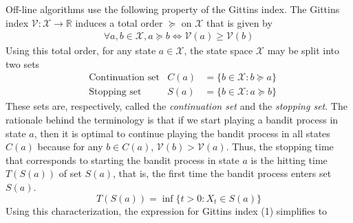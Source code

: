 \documentclass[11pt]{elegantbook}
\begin{document}
Off-line algorithms use the following property of the Gittins index. The Gittins
index $\mathcal{V}: \mathcal{X} \rightarrow \mathbb{R}$ induces a total order $\succeq$ on $\mathcal{X}$ that is given by
\begin{equation}
    \begin{aligned}
        \forall a,b\in \mathcal{X}, a\succeq b \Leftrightarrow \mathcal{V}(a)\geq \mathcal{V}(b)
    \end{aligned}
    \nonumber
\end{equation}
Using this total order, for any state $a\in \mathcal{X}$, the state space $\mathcal{X}$ may be split into two sets
\begin{equation}
    \begin{aligned}
        &\text{Continuation set}&C(a)&=\{b\in \mathcal{X}:b\succeq a\}\\
        &\text{Stopping set}&S(a)&=\{b\in \mathcal{X}:a\succeq b\}
    \end{aligned}
    \nonumber
\end{equation}
These sets are, respectively, called the \textit{continuation set} and the \textit{stopping set}. The rationale behind the terminology is that if
we start playing a bandit process in state $a$, then it is optimal to continue playing the bandit process in all states $C(a)$ because for any $b \in C(a)$, $\mathcal{V}(b) > \mathcal{V}(a)$. Thus, the stopping time that corresponds to starting the bandit process in state $a$ is the hitting time $T(S(a))$ of set $S(a)$, that is, the first time the bandit process enters set $S(a)$. $$T(S(a))=\inf\{t>0:X_t\in S(a)\}$$
Using this characterization, the expression for Gittins index (1) simplifies to
\end{document}
